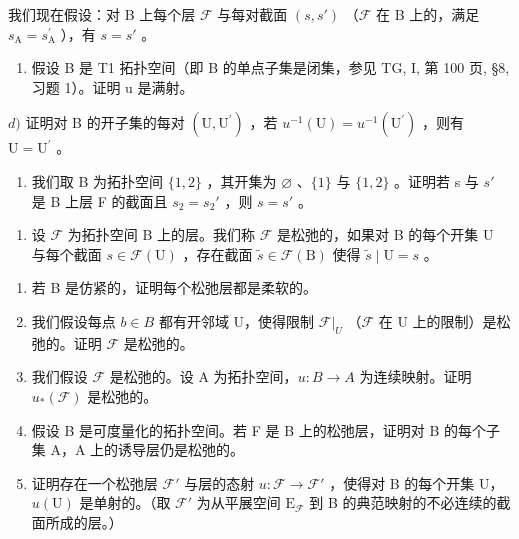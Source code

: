 我们现在假设：对 B 上每个层 \(\mathcal{F}\) 与每对截面 \((s,s')\) （\(\mathcal{F}\) 在 B 上的，满足 \(s_{\mathrm{A}} = s_{\mathrm{A}}^{\prime}\) ），有 \(s = s'\) 。

\begin{enumerate}
\def\labelenumi{\alph{enumi})}
\setcounter{enumi}{2}
\tightlist
\item
  假设 B 是 T1 拓扑空间（即 B 的单点子集是闭集，参见 TG, I, 第 100 页, §8, 习题 1）。证明 u 是满射。
\end{enumerate}

\(d)\) 证明对 B 的开子集的每对 \((\mathrm{U},\mathrm{U}^{\prime})\) ，若 \(u^{-1}(\mathrm{U}) = u^{-1}(\mathrm{U}^{\prime})\) ，则有 \(\mathrm{U} = \mathrm{U}^{\prime}\) 。

\begin{enumerate}
\def\labelenumi{\alph{enumi})}
\setcounter{enumi}{4}
\tightlist
\item
  我们取 B 为拓扑空间 \(\{1,2\}\) ，其开集为 \(\varnothing\) 、\(\{1\}\) 与 \(\{1,2\}\) 。证明若 s 与 \(s'\) 是 B 上层 F 的截面且 \(s_{2}=s_{2}'\) ，则 \(s=s'\) 。
\end{enumerate}

\begin{enumerate}
\def\labelenumi{\arabic{enumi})}
\setcounter{enumi}{5}
\tightlist
\item
  设 \(\mathcal{F}\) 为拓扑空间 B 上的层。我们称 \(\mathcal{F}\) 是松弛的，如果对 B 的每个开集 U 与每个截面 \(s \in \mathcal{F}(\mathrm{U})\) ，存在截面 \(\widetilde{s} \in \mathcal{F}(\mathrm{B})\) 使得 \(\widetilde{s} \mid \mathrm{U} = s\) 。
\end{enumerate}

\begin{enumerate}
\def\labelenumi{\alph{enumi})}
\item
  若 B 是仿紧的，证明每个松弛层都是柔软的。
\item
  我们假设每点 \(b \in B\) 都有开邻域 U，使得限制 \(\mathcal{F}|_{U}\) （\(\mathcal{F}\) 在 U 上的限制）是松弛的。证明 \(\mathcal{F}\) 是松弛的。
\item
  我们假设 \(\mathcal{F}\) 是松弛的。设 A 为拓扑空间，\(u\colon B\to A\) 为连续映射。证明 \(u_{*}(\mathcal{F})\) 是松弛的。
\item
  假设 B 是可度量化的拓扑空间。若 F 是 B 上的松弛层，证明对 B 的每个子集 A，A 上的诱导层仍是松弛的。
\item
  证明存在一个松弛层 \(\mathcal{F}'\) 与层的态射 \(u\colon \mathcal{F}\to \mathcal{F}'\) ，使得对 B 的每个开集 U，\(u(\mathrm{U})\) 是单射的。（取 \(\mathcal{F}'\) 为从平展空间 \(\mathrm{E}_{\mathcal{F}}\) 到 B 的典范映射的不必连续的截面所成的层。）
\end{enumerate}

